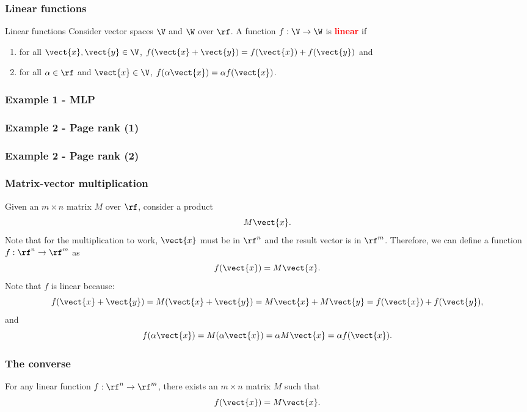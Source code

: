 


\begin{frame}
  \frametitle{Linear functions}

  \begin{block}{Linear functions}
    Consider vector spaces $\V$ and $\W$ over $\rf$.  A function
    $f:\V\rightarrow\W$ is \textcolor{red}{\bf linear} if
    \begin{enumerate}
    \item for all $\vect{x},\vect{y}\in\V$,
      $f(\vect{x}+\vect{y})=f(\vect{x}) + f(\vect{y})$ and
    \item for all $\alpha\in\rf$ and $\vect{x}\in\V$,
      $f(\alpha\vect{x})=\alpha f(\vect{x})$.
    \end{enumerate}
  \end{block}
\end{frame}

\begin{frame}
  \frametitle{Example 1 - MLP}
\end{frame}

\begin{frame}
  \frametitle{Example 2 - Page rank (1)}
\end{frame}

\begin{frame}
  \frametitle{Example 2 - Page rank (2)}
\end{frame}

\begin{frame}
  \frametitle{Matrix-vector multiplication}

  Given an $m\times n$ matrix $M$ over $\rf$, consider a product
  \[
  M\vect{x}.
  \]
  Note that for the multiplication to work, $\vect{x}$ must be in
  $\rf^n$ and the result vector is in $\rf^m$.  Therefore, we can define
  a function $f: \rf^n \rightarrow \rf^m$ as
  \[
  f(\vect{x}) = M\vect{x}.
  \]
  Note that $f$ is linear because:
  \[
  f(\vect{x}+\vect{y})=M(\vect{x}+\vect{y})=M\vect{x} + M\vect{y}=
  f(\vect{x})+f(\vect{y}),
  \]
  and
  \[
  f(\alpha\vect{x})=M(\alpha\vect{x})=\alpha M\vect{x} = \alpha f(\vect{x}).
  \]
\end{frame}

\begin{frame}
  \frametitle{The converse}
  \begin{lemma}
    For any linear function $f:\rf^n \rightarrow \rf^m$, there exists an
    $m\times n$ matrix $M$ such that
    \[
    f(\vect{x}) = M\vect{x}.
    \]
  \end{lemma}
\end{frame}

